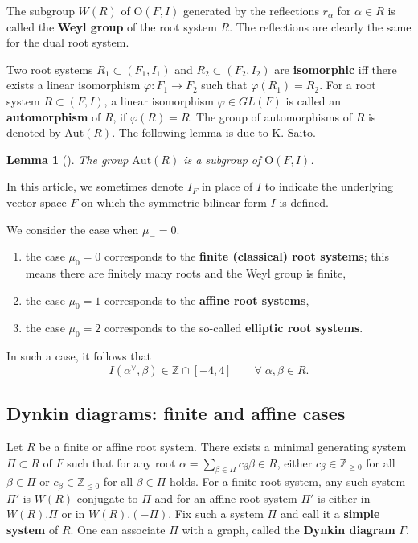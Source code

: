 \documentclass[11pt]{amsart}
\newcommand{\Z}{\mathbb{Z}}
\newtheorem{lemma}[thm]{Lemma}%
\begin{document}
The subgroup $W(R)$ of $\mathrm{O}(F,I)$ generated by the 
reflections $r_\alpha$ for 
$\alpha \in R$ is called the \textbf{Weyl group} of the root 
system $R$. The reflections are clearly the same for the dual root system.

Two root systems $R_1\subset (F_1,I_1)$ and $R_2 \subset (F_2,I_2)$ are \textbf{isomorphic} iff there exists a linear isomorphism 
$\varphi:F_1 \rightarrow F_2$ such that $\varphi(R_1)=R_2$. 
For a root system $R\subset (F,I)$, a linear isomorphism 
$\varphi\in GL(F)$ is called an \textbf{automorphism} of $R$, if 
$\varphi(R)=R$. The group of automorphisms of $R$ is denoted by 
$\mathrm{Aut}(R)$. 
The following lemma is due to K. Saito.
\begin{lemma}[\cite{Saito1985}]\label{lemma:Aut(R)}
The group $\mathrm{Aut}(R)$ is a subgroup of $\mathrm{O}(F,I)$. 
\end{lemma}


In this article, we sometimes denote $I_F$ in place of $I$ to indicate the underlying vector space $F$ on which the symmetric bilinear form $I$ is defined.

\bigskip
 
We consider the case when $\mu_-=0$.
\begin{enumerate}
\item the case $\mu_0=0$ corresponds to the \textbf{finite (classical) root systems};
 this means there are finitely many roots and the Weyl group is finite,
\item the case $\mu_0=1$ corresponds to the \textbf{affine root systems},
\item the case $\mu_0=2$ corresponds to the so-called \textbf{elliptic root systems}.
\end{enumerate}
In such a case, it follows that
\[ I(\alpha^\vee,\beta) \in \Z \cap [-4,4] \qquad \forall\; \alpha, \beta \in R.
\]
\subsection{Dynkin diagrams: finite and affine cases} 
Let $R$ be a finite or affine root system. There exists a minimal generating system $\Pi \subset R$ of $F$ such that for any root $\alpha=\sum_{\beta \in \Pi}c_\beta \beta \in R$, either $c_\beta \in \Z_{\geq 0}$ for all $\beta \in \Pi $  or  $c_\beta \in \Z_{\leq 0}$ for all $\beta \in \Pi$ holds. For a finite root system, any such system $\Pi'$
is $W(R)$-conjugate to $\Pi$ and for an affine root system $\Pi'$ is either in $W(R).\Pi$ or in $W(R).(-\Pi)$. Fix such a system $\Pi$ and call it a 
\textbf{simple system} of $R$. One can associate $\Pi$ with 
a graph, called the \textbf{Dynkin diagram} $\Gamma$.
\end{document}

